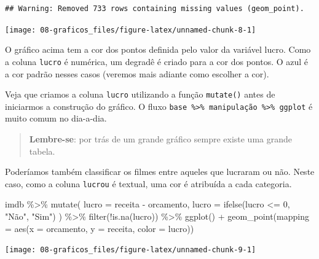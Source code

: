 \documentclass[
]{book}
\newenvironment{Shaded}{\begin{snugshade}}{\end{snugshade}}
\newcommand{\AttributeTok}[1]{\textcolor[rgb]{0.77,0.63,0.00}{#1}}
\newcommand{\DecValTok}[1]{\textcolor[rgb]{0.00,0.00,0.81}{#1}}
\newcommand{\FunctionTok}[1]{\textcolor[rgb]{0.00,0.00,0.00}{#1}}
\newcommand{\NormalTok}[1]{#1}
\newcommand{\SpecialCharTok}[1]{\textcolor[rgb]{0.00,0.00,0.00}{#1}}
\newcommand{\StringTok}[1]{\textcolor[rgb]{0.31,0.60,0.02}{#1}}
\begin{document}
\begin{verbatim}
## Warning: Removed 733 rows containing missing values (geom_point).
\end{verbatim}

\begin{center}\texttt{[image: 08-graficos\_files/figure-latex/unnamed-chunk-8-1]} \end{center}

O gráfico acima tem a cor dos pontos definida pelo valor da variável lucro. Como a coluna \texttt{lucro} é numérica, um degradê é criado para a cor dos pontos. O azul é a cor padrão nesses casos (veremos mais adiante como escolher a cor).

Veja que criamos a coluna \texttt{lucro} utilizando a função \texttt{mutate()} antes de iniciarmos a construção do gráfico. O fluxo \texttt{base\ \%\textgreater{}\%\ manipulação\ \%\textgreater{}\%\ ggplot} é muito comum no dia-a-dia.

\begin{quote}
\textbf{Lembre-se}: por trás de um grande gráfico sempre existe uma grande tabela.
\end{quote}

Poderíamos também classificar os filmes entre aqueles que lucraram ou não. Neste caso, como a coluna \texttt{lucrou} é textual, uma cor é atribuída a cada categoria.

\begin{Shaded}
\begin{Highlighting}[]
\NormalTok{imdb }\SpecialCharTok{\%\textgreater{}\%}
   \FunctionTok{mutate}\NormalTok{(}
    \AttributeTok{lucro =}\NormalTok{ receita }\SpecialCharTok{{-}}\NormalTok{ orcamento,}
    \AttributeTok{lucro =} \FunctionTok{ifelse}\NormalTok{(lucro }\SpecialCharTok{\textless{}=} \DecValTok{0}\NormalTok{, }\StringTok{"Não"}\NormalTok{, }\StringTok{"Sim"}\NormalTok{)}
\NormalTok{  ) }\SpecialCharTok{\%\textgreater{}\%} 
  \FunctionTok{filter}\NormalTok{(}\SpecialCharTok{!}\FunctionTok{is.na}\NormalTok{(lucro)) }\SpecialCharTok{\%\textgreater{}\%} 
  \FunctionTok{ggplot}\NormalTok{() }\SpecialCharTok{+} 
  \FunctionTok{geom\_point}\NormalTok{(}\AttributeTok{mapping =} \FunctionTok{aes}\NormalTok{(}\AttributeTok{x =}\NormalTok{ orcamento, }\AttributeTok{y =}\NormalTok{ receita, }\AttributeTok{color =}\NormalTok{ lucro))}
\end{Highlighting}
\end{Shaded}

\begin{center}\texttt{[image: 08-graficos\_files/figure-latex/unnamed-chunk-9-1]} \end{center}
\end{document}
